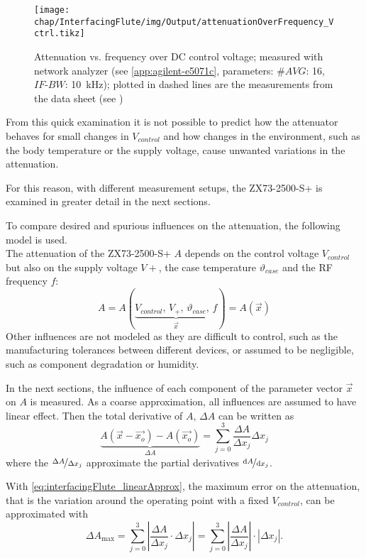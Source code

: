\begin{figure}[tb]
	\centering
	\texttt{[image: chap/InterfacingFlute/img/Output/attenuationOverFrequency\_Vctrl.tikz]}
	\caption{Attenuation vs. frequency over DC control voltage; measured with network analyzer (see \ref{app:agilent-e5071c}, parameters: $\#AVG$: 16, $IF\text{-}BW$: \SI{10}{\kHz}); plotted in dashed lines are the measurements from the data sheet (see \cite[p.~2]{mini-circuitsZX732500VoltageVariable})}
	\label{fig:interfacingFlute_atteneval-overview-NA}
\end{figure}

From this quick examination it is not possible to predict how the attenuator behaves for small changes in $V_{control}$ and how changes in the environment, such as the body temperature or the supply voltage, cause unwanted variations in the attenuation. 

For this reason, with different measurement setups, the ZX73-2500-S+ is examined in greater detail in the next sections.

To compare desired and spurious influences on the attenuation, the following model is used.\\
The attenuation of the ZX73-2500-S+ $A$ depends on the control voltage $V_{control}$ but also on the supply voltage $V+$, the case temperature $\vartheta_{case}$ and the RF frequency $f$:
\begin{equation}
A=A(\underbrace{V_{control},\,V_+,\,\vartheta_{case},\,f}_{\vec{x}}) = A\left(\vec{x}\right)
\end{equation}
Other influences are not modeled as they are difficult to control, such as the manufacturing tolerances between different devices, or assumed to be negligible, such as component degradation or humidity.

In the next sections, the influence of each component of the parameter vector $\vec{x}$ on $A$ is measured. As a coarse approximation, all influences are assumed to have linear effect. Then the total derivative of $A$, $\Delta A$ can be written as
\begin{equation}\label{eq:interfacingFlute_linearApprox}
\underbrace{A(\vec{x}-\vec{x_o})-A(\vec{x_o})}_{\Delta A} = \sum_{j=0}^{3} \frac{\Delta A}{\Delta x_j} \Delta x_j
\end{equation}
where the $\nicefrac{\Delta A}{\Delta x_j}$ approximate the partial derivatives $\nicefrac{\text{d}{A}}{\text{d}{x_j}}$.

With \autoref{eq:interfacingFlute_linearApprox}, the maximum error on the attenuation, that is the variation around the operating point with a fixed $V_{control}$, can be approximated with
\begin{equation}\label{eq:interfacingFlute_maxerror}
\Delta A_{\text{max}} = \sum_{j=0}^{3} \left|\frac{\Delta A}{\Delta x_j} \cdot \Delta x_j\right| 
= \sum_{j=0}^{3} \left|\frac{\Delta A}{\Delta x_j}\right| \cdot \left|\Delta x_j\right|.
\end{equation}

